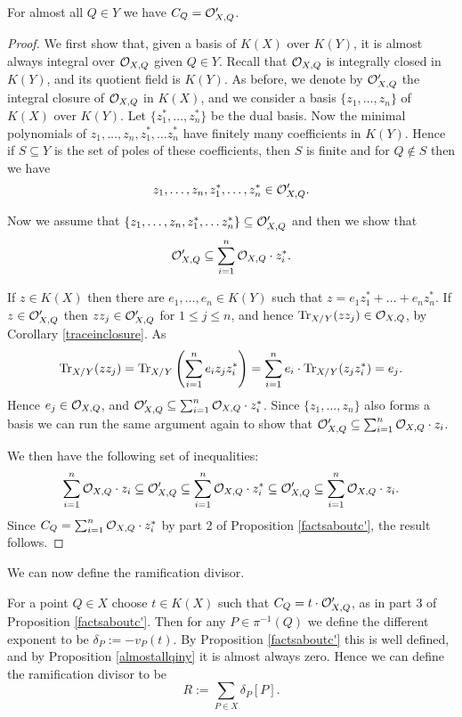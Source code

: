 \begin{prop}\label{almostallqiny}
 For almost all $Q\in Y$ we have $C_Q= {\cal O}_{X,Q}'$.
\end{prop}
\begin{proof}
 We first show that, given a basis of $K(X)$ over $K(Y)$, it is almost always integral over ${\cal O}_{X,Q}$ given $Q\in Y$.
 Recall that ${\cal O}_{X,Q}$ is integrally closed in $K(Y)$, and its quotient field is $K(Y)$.
 As before, we denote by ${\cal O}_{X,Q}'$ the integral closure of ${\cal O}_{X,Q}$ in $K(X)$, and we consider a basis $\{z_1,\ldots ,z_n\}$ of $K(X)$ over $K(Y)$.
 Let $\{z_1^*,\ldots ,z_n^*\}$ be the dual basis.
 Now the minimal polynomials of $z_1,\ldots, z_n,z_1^*,\ldots z_n^*$ have finitely many coefficients in $K(Y)$.
 Hence if $S\subseteq Y$ is the set of poles of these coefficients, then $S$ is finite and for $Q\notin S$ then we have
 \[
  z_1,\ldots,z_n,z_1^*,\ldots, z_n^*\in {\cal O}_{X,Q}'.
 \]

 
 
Now we assume that $\{z_1,\ldots ,z_n,z_1^*,\ldots z_n^*\}\subseteq {\cal O}_{X,Q}'$ and then we show that 
\[
  {\cal O}_{X,Q}' \subseteq \sum_{i=1}^n {\cal O}_{X,Q}\cdot z_i^*.
\]

 If $z\in K(X)$ then there are $e_1,\ldots, e_n\in K(Y)$ such that $z=e_1z_1^*+\ldots +e_nz_n^*$.
 If $z\in {\cal O}_{X,Q}'$ then $zz_j\in {\cal O}_{X,Q}'$ for $1\leq j\leq n$, and hence $\operatorname{Tr}_{X/Y}(zz_j)\in {\cal O}_{X,Q}$, by Corollary \ref{traceinclosure}.
 As
 \[
  \operatorname{Tr}_{X/Y}(zz_j) = \operatorname{Tr}_{X/Y}\left(\sum_{i=1}^n e_iz_jz_i^*\right) = \sum_{i=1}^ne_i\cdot \operatorname{Tr}_{X/Y}(z_jz_i^*) = e_j.
 \]
  Hence $e_j\in {\cal O}_{X,Q}$, and ${\cal O}_{X,Q}'\subseteq \sum_{i=1}^n{\cal O}_{X,Q}\cdot z_i^*$.
  Since $\{z_1,\ldots, z_n\}$ also forms a basis we can run the same argument again to show that ${\cal O}_{X,Q}'\subseteq \sum_{i=1}^n{\cal O}_{X,Q}\cdot z_i$.
  
  We then have the following set of inequalities:
  \[
   \sum_{i=1}^n {\cal O}_{X,Q}\cdot z_i \subseteq {\cal O}_{X,Q}' \subseteq \sum_{i=1}^n{\cal O}_{X,Q}\cdot z_i^* \subseteq {\cal O}_{X,Q}'\subseteq \sum_{i=1}^n {\cal O}_{X,Q}\cdot z_i.
  \]
Since $C_Q = \sum_{i=1}^n {\cal O}_{X,Q}\cdot z_i^*$ by part 2 of Proposition \ref{factsaboutc'}, the result follows.
\end{proof}

We can now define the ramification divisor.


\begin{defn}
 For a point $Q\in X$ choose $t\in K(X)$ such that $C_Q = t\cdot {\cal O}_{X,Q}'$, as in part 3 of Proposition \ref{factsaboutc'}.
 Then for any $P\in \pi^{-1}(Q)$ we define the different exponent to be $\delta_P := -v_P(t)$.
 By Proposition \ref{factsaboutc'} this is well defined, and by Proposition \ref{almostallqiny} it is almost always zero.
 Hence we can define the ramification divisor to be
 \[
  R := \sum_{P\in X} \delta_P [P].
 \]
\end{defn}

